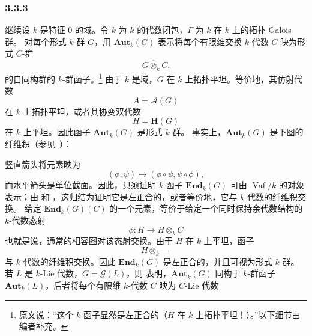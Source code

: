 
\subsubsection*{3.3.3}
\label{sga3:VIIB:3.3.3}
继续设 \(k\) 是特征 \(0\) 的域。令 \(\overline k\) 为 \(k\) 的代数闭包，\(\Gamma\) 为 \(\overline k\) 在 \(k\) 上的拓扑 Galois 群。
对每个形式 \(k\)-群 \(G\)，用 \(\mathbf{Aut}_k(G)\) 表示将每个有限维交换 \(k\)-代数 \(C\) 映为形式 \(C\)-群
\[
  G\widehat\otimes_k C.
\]
的自同构群的 \(k\)-群函子。\footnote{\label{sga3:VIIB:nde:132}原文说：“这个 \(k\)-函子显然是左正合的\textup{（\(H\) 在 \(k\) 上拓扑平坦！）}。”以下细节由编者补充。}
由于 \(k\) 是域，\(G\) 在 \(k\) 上拓扑平坦。等价地，其仿射代数
\[
  A=\mathcal A(G)
\]
在 \(k\) 上拓扑平坦，或者其协变双代数
\[
  H=\mathbf H(G)
\]
在 \(k\) 上平坦。因此函子 \(\mathbf{Aut}_k(G)\) 是形式 \(k\)-群。
事实上，\(\mathbf{Aut}_k(G)\) 是下图的纤维积\textup{（参见\ ）}：
\begin{center}
  \label{sga3:VIIB:3.3.3:automorphism-fiber-product-diagram}
  
\end{center}
竖直箭头将元素映为
\[
  (\phi,\psi)\longmapsto(\phi\circ\psi,\psi\circ\phi),
\]
而水平箭头是单位截面。因此，只须证明 \(k\)-函子 \(\mathbf{End}_k(G)\) 可由 \(\operatorname{Vaf}/k\) 的对象表示；由  和 ，这归结为证明它是左正合的，或者等价地，它与 \(k\)-代数的纤维积交换。
给定 \(\mathbf{End}_k(G)(C)\) 的一个元素，等价于给定一个同时保持余代数结构的 \(k\)-代数态射
\[
  \phi:H\longrightarrow H\otimes_k C
\]
也就是说，通常的相容图对该态射交换。由于 \(H\) 在 \(k\) 上平坦，函子
\[
  H\otimes_k -
\]
与 \(k\)-代数的纤维积交换。因此 \(\mathbf{End}_k(G)\) 是左正合的，并且可视为形式 \(k\)-群。
若 \(L\) 是 \(k\)-Lie 代数，\(G=\mathscr G(L)\)，则 表明，\(\mathbf{Aut}_k(G)\) 同构于 \(k\)-群函子 \(\mathbf{Aut}_k(L)\)，后者将每个有限维 \(k\)-代数 \(C\) 映为 \(C\)-Lie 代数
